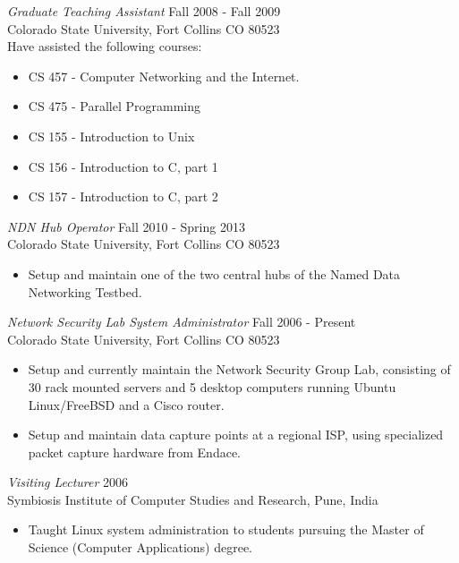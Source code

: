 \documentclass[line,margin]{res}
\begin{document}
\begin{resume}
   {\sl Graduate Teaching Assistant} \hfill Fall 2008 - Fall 2009\\
        Colorado State University, Fort Collins CO 80523\\
        Have assisted the following courses:
        \begin{itemize}  \itemsep -2pt
            \item CS 457 - Computer Networking and the Internet.
            \item CS 475 - Parallel Programming
            \item CS 155 - Introduction to Unix
            \item CS 156 - Introduction to C, part 1
            \item CS 157 - Introduction to C, part 2
         \end{itemize}

    {\sl NDN Hub Operator} \hfill {Fall 2010 - Spring 2013}\\
     	Colorado State University, Fort Collins CO 80523
	\begin{itemize} \itemsep -2pt
		\item Setup and maintain one of the two central hubs of the Named Data
		Networking Testbed.
	\end{itemize}

    {\sl Network Security Lab System Administrator} \hfill Fall 2006 - Present\\
        Colorado State University, Fort Collins CO 80523
        \begin{itemize} \itemsep -2pt
            \item Setup and currently maintain the Network Security Group Lab,
            consisting of 30 rack mounted servers and 5 desktop computers
            running Ubuntu Linux/FreeBSD and a Cisco router.
            \item Setup and maintain data capture points at a regional ISP, using
            specialized packet capture hardware from Endace.
        \end{itemize}

    {\sl Visiting Lecturer} \hfill 2006\\
        Symbiosis Institute of Computer Studies and Research, Pune, India
        \begin{itemize} \itemsep -2pt
            \item Taught Linux system administration to students pursuing the Master
            of Science (Computer Applications) degree.
        \end{itemize}


\end{resume}
\end{document}
